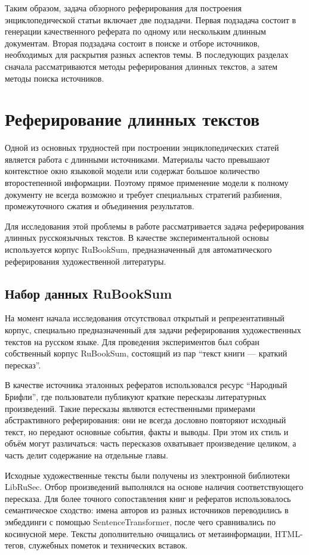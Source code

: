 \documentclass[oneside,senior,etd]{BYUPhys}
\begin{document}
Таким образом, задача обзорного реферирования для построения энциклопедической статьи включает две подзадачи. Первая подзадача состоит в генерации качественного реферата по одному или нескольким длинным документам. Вторая подзадача состоит в поиске и отборе источников, необходимых для раскрытия разных аспектов темы. В последующих разделах сначала рассматриваются методы реферирования длинных текстов, а затем методы поиска источников.

\section{Реферирование длинных текстов}

Одной из основных трудностей при построении энциклопедических статей является работа с длинными источниками. 
Материалы часто превышают контекстное окно языковой модели или содержат большое количество второстепенной информации. 
Поэтому прямое применение модели к полному документу не всегда возможно и требует специальных стратегий разбиения, 
промежуточного сжатия и объединения результатов.

Для исследования этой проблемы в работе рассматривается задача реферирования длинных русскоязычных текстов. 
В качестве экспериментальной основы используется корпус RuBookSum, 
предназначенный для автоматического реферирования художественной литературы. 

\subsection{Набор данных RuBookSum}

На момент начала исследования отсутствовал открытый и репрезентативный корпус, 
специально предназначенный для задачи реферирования художественных текстов на русском языке. 
Для проведения экспериментов был собран собственный корпус RuBookSum, состоящий из пар ``текст книги --- краткий пересказ''.

В качестве источника эталонных рефератов использовался ресурс ``Народный Брифли'', 
где пользователи публикуют краткие пересказы литературных произведений. 
Такие пересказы являются естественными примерами абстрактивного реферирования: 
они не всегда дословно повторяют исходный текст, но передают основные события, факты и выводы. 
При этом их стиль и объём могут различаться: часть пересказов охватывает произведение целиком, 
а часть делит содержание на отдельные главы.

Исходные художественные тексты были получены из электронной библиотеки LibRuSec. 
Отбор произведений выполнялся на основе наличия соответствующего пересказа. 
Для более точного сопоставления книг и рефератов использовалось семантическое сходство: 
имена авторов из разных источников переводились в эмбеддинги с помощью SentenceTransformer, 
после чего сравнивались по косинусной мере. Тексты дополнительно очищались от метаинформации, 
HTML-тегов, служебных пометок и технических вставок.
\end{document}
